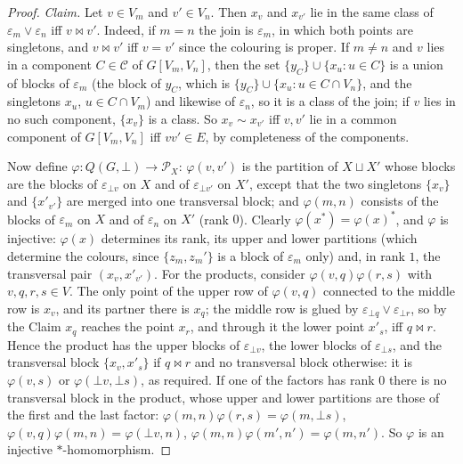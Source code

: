 \documentclass[11pt]{amsart}
\theoremstyle{definition}
\renewcommand{\P}{\mathcal{P}}      %
\newcommand{\mt}{\bowtie}      %
\begin{document}
\begin{proof}
\emph{Claim.} Let $v\in V_m$ and $v'\in V_n$. Then $x_v$ and $x_{v'}$ lie in the same class of $\varepsilon_m\vee\varepsilon_n$ iff $v\mt v'$. Indeed, if $m=n$ the join is $\varepsilon_m$, in which both points are singletons, and $v\mt v'$ iff $v=v'$ since the colouring is proper. If $m\ne n$ and $v$ lies in a component $C\in\mathcal C$ of $G[V_m,V_n]$, then the set $\{y_C\}\cup\{x_u:u\in C\}$ is a union of blocks of $\varepsilon_m$ (the block of $y_C$, which is $\{y_C\}\cup\{x_u:u\in C\cap V_n\}$, and the singletons $x_u$, $u\in C\cap V_m$) and likewise of $\varepsilon_n$, so it is a class of the join; if $v$ lies in no such component, $\{x_v\}$ is a class. So $x_v\sim x_{v'}$ iff $v,v'$ lie in a common component of $G[V_m,V_n]$ iff $vv'\in E$, by completeness of the components.

Now define $\varphi\colon Q(G,\bot)\to\P_X$: $\varphi(v,v')$ is the partition of $X\sqcup X'$ whose blocks are the blocks of $\varepsilon_{\bot v}$ on $X$ and of $\varepsilon_{\bot v'}$ on $X'$, except that the two singletons $\{x_v\}$ and $\{x'_{v'}\}$ are merged into one transversal block; and $\varphi(m,n)$ consists of the blocks of $\varepsilon_m$ on $X$ and of $\varepsilon_n$ on $X'$ (rank $0$). Clearly $\varphi(x^*)=\varphi(x)^*$, and $\varphi$ is injective: $\varphi(x)$ determines its rank, its upper and lower partitions (which determine the colours, since $\{z_m,z_m'\}$ is a block of $\varepsilon_m$ only) and, in rank $1$, the transversal pair $(x_v,x'_{v'})$. For the products, consider $\varphi(v,q)\varphi(r,s)$ with $v,q,r,s\in V$. The only point of the upper row of $\varphi(v,q)$ connected to the middle row is $x_v$, and its partner there is $x_q$; the middle row is glued by $\varepsilon_{\bot q}\vee\varepsilon_{\bot r}$, so by the Claim $x_q$ reaches the point $x_r$, and through it the lower point $x'_s$, iff $q\mt r$. Hence the product has the upper blocks of $\varepsilon_{\bot v}$, the lower blocks of $\varepsilon_{\bot s}$, and the transversal block $\{x_v,x'_s\}$ if $q\mt r$ and no transversal block otherwise: it is $\varphi(v,s)$ or $\varphi(\bot v,\bot s)$, as required. If one of the factors has rank $0$ there is no transversal block in the product, whose upper and lower partitions are those of the first and the last factor: $\varphi(m,n)\varphi(r,s)=\varphi(m,\bot s)$, $\varphi(v,q)\varphi(m,n)=\varphi(\bot v,n)$, $\varphi(m,n)\varphi(m',n')=\varphi(m,n')$. So $\varphi$ is an injective $*$-homomorphism.
\end{proof}
\end{document}
